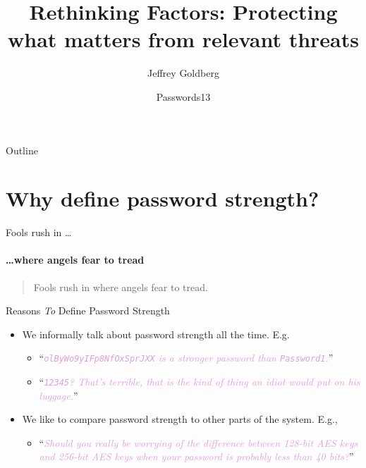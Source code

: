 \documentclass[xcolor={dvipsnames,table}]{beamer}
\title[Rethinking Factors]
  {Rethinking Factors: Protecting what matters from relevant threats}
\author[Goldberg, Haugh, Irwin]
\author{Jeffrey Goldberg}
\institute[AgileBits] %
{%
  Chief Defender Against the Dark Arts\\
  AgileBits Inc.\\
  \texttt{jeff@agilebits.com}}
\date[Password13]{Passwords13}
\newcommand\pwd[1]{\texttt{#1}}
\newcommand\tquote[1]{``\textit{\textcolor{Plum}{#1}}''}
\begin{document}
\begin{frame}
  \titlepage
\end{frame}

\begin{frame}{Outline}
  \tableofcontents
\end{frame}

\section{Why define password strength?}


\begin{frame}{Fools rush in \dots }
\framesubtitle{\dots where angels fear to tread}
\begin{quote}
Fools rush in where angels fear to tread.
\end{quote}
\end{frame}

\begin{frame}{Reasons \emph{To} Define Password Strength}

  \begin{itemize}
  \item We informally talk about password strength all the time. E.g.
    \begin{itemize}
    \pause
    \item \tquote{\pwd{olByWo9yIFp8NfOxSprJXX} is a stronger password than  \pwd{Password1}.}
    \pause
    \item \tquote{\pwd{12345}? That's terrible, that is the kind of thing an idiot would put on his luggage.}
    \end{itemize}
  \pause
  \item We like to compare password strength to other parts of the system. E.g.,
    \begin{itemize}
    \pause
    \item \tquote{Should you really be worrying of the difference between 128-bit AES keys and 256-bit AES keys when your password is probably less than 40 bits?}
    \end{itemize}
   \end{itemize}
\end{frame}
\end{document}
